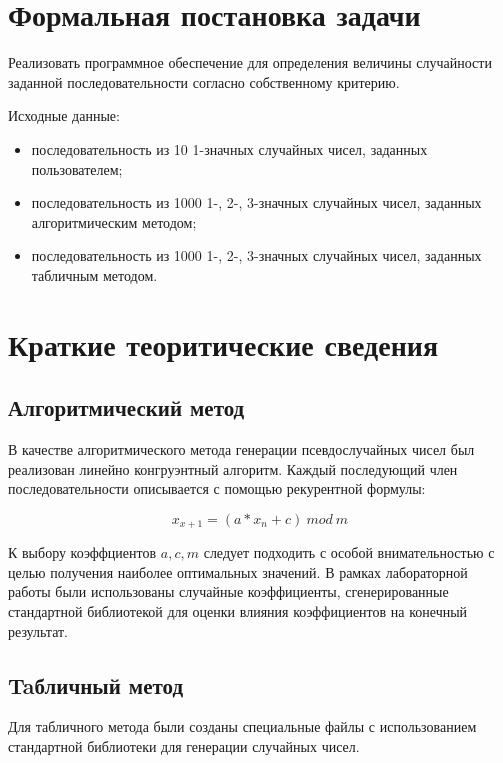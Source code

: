 \section*{Формальная постановка задачи}

Реализовать программное обеспечение для определения величины случайности заданной последовательности согласно собственному критерию.

Исходные данные:
\begin{itemize}
	\item последовательность из 10 1-значных случайных чисел, заданных пользователем;
	\item последовательность из 1000 1-, 2-, 3-значных случайных чисел, заданных алгоритмическим методом;
	\item последовательность из 1000 1-, 2-, 3-значных случайных чисел, заданных табличным методом.
\end{itemize}

\section*{Краткие теоритические сведения}

\subsection*{Алгоритмический метод}

В качестве алгоритмического метода генерации псевдослучайных чисел был реализован линейно конгруэнтный алгоритм. Каждый последующий член последовательности описывается с помощью рекурентной формулы:

\begin{equation}
	x_{x+1} = (a * x_n + c) \: mod \: m
\end{equation}

К выбору коэффциентов $a, c, m$ следует подходить с особой внимательностью с целью получения наиболее оптимальных значений. В рамках лабораторной работы были использованы случайные коэффициенты, сгенерированные стандартной библиотекой для оценки влияния коэффициентов на конечный результат.

\subsection*{Taбличный метод}

Для табличного метода были созданы специальные файлы с использованием стандартной библиотеки для генерации случайных чисел.

